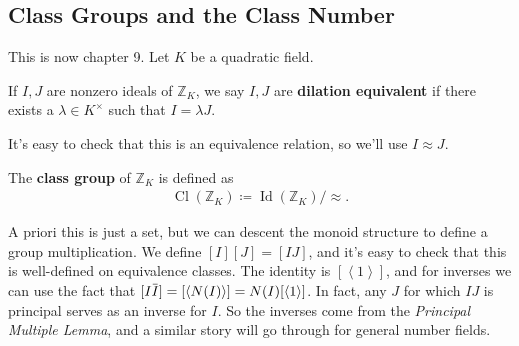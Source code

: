 \hypertarget{class-groups-and-the-class-number}{%
\subsection{Class Groups and the Class
Number}\label{class-groups-and-the-class-number}}

\begin{remark}

This is now chapter 9. Let \(K\) be a quadratic field.

\end{remark}

\begin{definition}

If \(I, J\) are nonzero ideals of \({\mathbb{Z}}_K\), we say \(I, J\)
are \textbf{dilation equivalent} if there exists a
\(\lambda\in K^{\times}\) such that \(I = \lambda J\).

\end{definition}

\begin{remark}

It's easy to check that this is an equivalence relation, so we'll use
\(I \approx J\).

\end{remark}

\begin{definition}

The \textbf{class group} of \({\mathbb{Z}}_K\) is defined as
\begin{align*}
{ \operatorname{Cl}} ({\mathbb{Z}}_K) \coloneqq\operatorname{Id}({\mathbb{Z}}_K)/\approx
.\end{align*}

\end{definition}

\begin{remark}

A priori this is just a set, but we can descent the monoid structure to
define a group multiplication. We define \([I] [J] = [IJ]\), and it's
easy to check that this is well-defined on equivalence classes. The
identity is \([ \left\langle{ 1 }\right\rangle]\), and for inverses we
can use the fact that
\([I \mkern 1.5mu\overline{\mkern-1.5muI\mkern-1.5mu}\mkern 1.5mu] = [\left\langle{ N(I) }\right\rangle] = N(I) [ \left\langle{ 1 }\right\rangle ]\).
In fact, any \(J\) for which \(IJ\) is principal serves as an inverse
for \(I\). So the inverses come from the \emph{Principal Multiple
Lemma}, and a similar story will go through for general number fields.

\end{remark}


